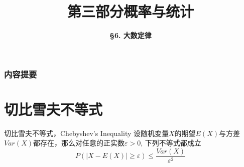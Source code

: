 



\title[Probability \& Statistics]{\LARGE \bfseries 第三部分\quad 概率与统计} %
\author[Law of Large Numbers] %
{\Large \bfseries \S 6. 大数定律}
\date{}






\begin{frame}

\titlepage %

\end{frame}


\begin{frame}
\frametitle{内容提要} %
\tableofcontents %
\end{frame}


\section{切比雪夫不等式}


\begin{frame}

\begin{block}{切比雪夫不等式，Chebyshev's Inequality}
设随机变量$X$的期望$E(X)$与方差$Var(X)$都存在，那么对任意的正实数$\varepsilon > 0$, 下列不等式都成立
$$P(\vert X - E(X) \vert \ge \varepsilon) \le \dfrac{Var(X)}{\varepsilon^2}$$
\end{block}

\end{frame}

